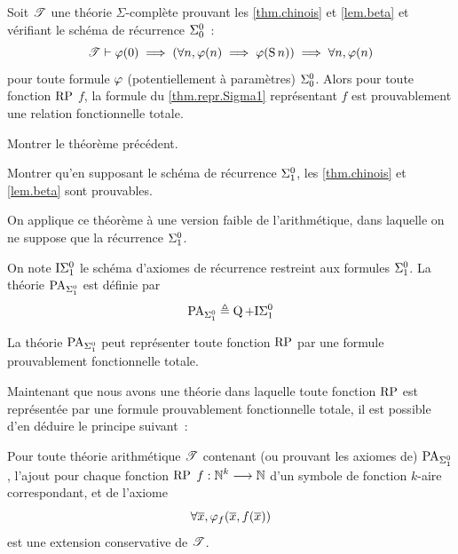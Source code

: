\begin{theorem}
  \label{thm.Srepr.Sigma1}
  Soit $\mathscr T$ une théorie $\Sigma$-complète prouvant les
  \cref{thm.chinois} et \cref{lem.beta} et vérifiant le schéma de récurrence
  $\Sigma^0_{0}$~:
  \[\mathscr T \vdash \varphi(0) \implies (\forall n, \varphi(n) \implies
  \varphi(\operatorname{S} n)) \implies \forall n, \varphi(n)\]
  pour toute formule $\varphi$ (potentiellement à paramètres) $\Sigma^0_{0}$.
  Alors pour toute fonction $\operatorname{RP}$ $f$,
  la formule du \cref{thm.repr.Sigma1} représentant $f$ est prouvablement
  une relation fonctionnelle totale.
\end{theorem}

\begin{exercise}
  Montrer le théorème précédent.
\end{exercise}

\begin{exercise}
  Montrer qu'en supposant le schéma de récurrence $\Sigma^0_{1}$, les
  \cref{thm.chinois} et \cref{lem.beta} sont prouvables.
\end{exercise}

On applique ce théorème à une version faible de l'arithmétique, dans laquelle
on ne suppose que la récurrence $\Sigma^0_{1}$.

\begin{definition}
  On note $\ISigma$ le schéma d'axiomes de récurrence restreint aux formules
  $\Sigma^0_{1}$. La théorie $\ArithISigma$ est définie par
  \[\operatorname{PA}_{\Sigma^0_{1}} \triangleq \operatorname{Q} + \mathrm{I}{\Sigma^0_{1}}\]
  \index[notation]{$\ISigma$}
  \index[notation]{$\ArithISigma$}
\end{definition}

\begin{corollary}
  La théorie $\ArithISigma$ peut représenter toute fonction $\operatorname{RP}$ par une
  formule prouvablement fonctionnelle totale.
\end{corollary}

Maintenant que nous avons une théorie dans laquelle toute fonction $\operatorname{RP}$ est
représentée par une formule prouvablement fonctionnelle totale, il est possible
d'en déduire le principe suivant~:

\begin{theorem}
  Pour toute théorie arithmétique $\mathscr T$ contenant (ou prouvant les
  axiomes de) $\ArithISigma$, l'ajout pour chaque fonction $\operatorname{RP}$
  $f : \displaystyle \mathbb N^k \longrightarrow \mathbb N$ d'un symbole de fonction $k$-aire
  correspondant, et de l'axiome
  \[\forall \overline{x}, \varphi_f(\overline{x},f(\overline{x}))\]
  est une extension conservative de $\mathscr T$.
\end{theorem}

